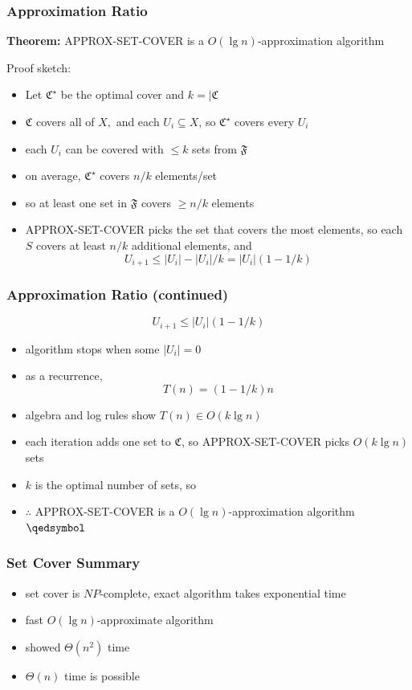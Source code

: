 \documentclass{beamer}
\begin{document}
\begin{frame} \frametitle{Approximation Ratio}
\textbf{Theorem:} APPROX-SET-COVER is a $O(\lg n)$-approximation algorithm

Proof sketch:
\begin{itemize}
  \item Let $\mathfrak{C}^\star$ be the optimal cover and $k=|\mathfrak{C}$
  \item $\mathfrak{C}$ covers all of $X,$ and each $U_i \subseteq X$, so $\mathfrak{C}^\star$ covers every $U_i$
  \item each $U_i$ can be covered with $\leq k$ sets from $\mathfrak{F}$
  \item on average, $\mathfrak{C}^\star$ covers $n/k$ elements/set
  \item so at least one set in $\mathfrak{F}$ covers $\geq n/k$ elements
  \item APPROX-SET-COVER picks the set that covers the most elements, so each $S$ covers at least $n/k$ additional elements,
    and \[ U_{i+1} \leq |U_i| - |U_i|/k = |U_i|(1-1/k) \]
\end{itemize}
\end{frame}

\begin{frame} \frametitle{Approximation Ratio (continued)}
  \[ U_{i+1} \leq |U_i|(1-1/k) \]
  \begin{itemize}
    \item algorithm stops when some $|U_i|=0$
    \item as a recurrence,
      \[ T(n) = (1-1/k)n \]
    \item algebra and log rules show $T(n) \in O(k \lg n)$
    \item each iteration adds one set to $\mathfrak{C}$, so APPROX-SET-COVER picks $O(k \lg n)$ sets
    \item $k$ is the optimal number of sets, so
    \item $\therefore$ APPROX-SET-COVER is a $O(\lg n)$-approximation algorithm $\qedsymbol$
  \end{itemize}
  \end{frame}
  
\begin{frame} \frametitle{Set Cover Summary}
\begin{itemize}
  \item set cover is $NP$-complete, exact algorithm takes exponential time
  \item fast $O(\lg n)$-approximate algorithm
  \item showed $\Theta(n^2)$ time
  \item $\Theta(n)$ time is possible
\end{itemize}
\end{frame}
\end{document}

